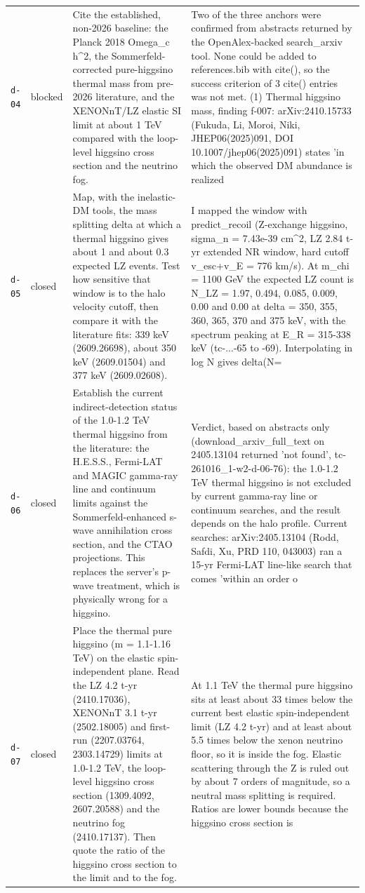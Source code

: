 \documentclass[11pt,a4paper]{article}
\begin{document}
\begin{longtable}{@{}p{}p{}p{}p{}@{}}
\texttt{d-04} & blocked & Cite the established, non-2026 baseline: the Planck 2018 Omega\_c h\textasciicircum{}2, the Sommerfeld-corrected pure-higgsino thermal mass from pre-2026 literature, and the XENONnT/LZ elastic SI limit at about 1 TeV compared with the loop-level higgsino cross section and the neutrino fog. & Two of the three anchors were confirmed from abstracts returned by the OpenAlex-backed search\_arxiv tool. None could be added to references.bib with cite(), so the success criterion of 3 cite() entries was not met. (1) Thermal higgsino mass, finding f-007: arXiv:2410.15733 (Fukuda, Li, Moroi, Niki, JHEP06(2025)091, DOI 10.1007/jhep06(2025)091) states 'in which the observed DM abundance is realized \\
\texttt{d-05} & closed & Map, with the inelastic-DM tools, the mass splitting delta at which a thermal higgsino gives about 1 and about 0.3 expected LZ events. Test how sensitive that window is to the halo velocity cutoff, then compare it with the literature fits: 339 keV (2609.26698), about 350 keV (2609.01504) and 377 keV (2609.02608). & I mapped the window with predict\_recoil (Z-exchange higgsino, sigma\_n = 7.43e-39 cm\textasciicircum{}2, LZ 2.84 t-yr extended NR window, hard cutoff v\_esc+v\_E = 776 km/s). At m\_chi = 1100 GeV the expected LZ count is N\_LZ = 1.97, 0.494, 0.085, 0.009, 0.00 and 0.00 at delta = 350, 355, 360, 365, 370 and 375 keV, with the spectrum peaking at E\_R = 315-338 keV (tc-...-65 to -69). Interpolating in log N gives delta(N= \\
\texttt{d-06} & closed & Establish the current indirect-detection status of the 1.0-1.2 TeV thermal higgsino from the literature: the H.E.S.S., Fermi-LAT and MAGIC gamma-ray line and continuum limits against the Sommerfeld-enhanced s-wave annihilation cross section, and the CTAO projections. This replaces the server's p-wave treatment, which is physically wrong for a higgsino. & Verdict, based on abstracts only (download\_arxiv\_full\_text on 2405.13104 returned 'not found', tc-261016\_1-w2-d-06-76): the 1.0-1.2 TeV thermal higgsino is not excluded by current gamma-ray line or continuum searches, and the result depends on the halo profile. Current searches: arXiv:2405.13104 (Rodd, Safdi, Xu, PRD 110, 043003) ran a 15-yr Fermi-LAT line-like search that comes 'within an order o \\
\texttt{d-07} & closed & Place the thermal pure higgsino (m = 1.1-1.16 TeV) on the elastic spin-independent plane. Read the LZ 4.2 t-yr (2410.17036), XENONnT 3.1 t-yr (2502.18005) and first-run (2207.03764, 2303.14729) limits at 1.0-1.2 TeV, the loop-level higgsino cross section (1309.4092, 2607.20588) and the neutrino fog (2410.17137). Then quote the ratio of the higgsino cross section to the limit and to the fog. & At 1.1 TeV the thermal pure higgsino sits at least about 33 times below the current best elastic spin-independent limit (LZ 4.2 t-yr) and at least about 5.5 times below the xenon neutrino floor, so it is inside the fog. Elastic scattering through the Z is ruled out by about 7 orders of magnitude, so a neutral mass splitting is required. Ratios are lower bounds because the higgsino cross section is \\

\end{longtable}
\end{document}
